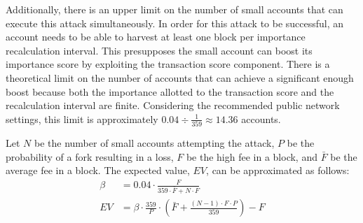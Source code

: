 Additionally, there is an upper limit on the number of small accounts that can execute this attack simultaneously.
In order for this attack to be successful, an account needs to be able to harvest at least one block per importance recalculation interval.
This presupposes the small account can boost its importance score by exploiting the transaction score component.
There is a theoretical limit on the number of accounts that can achieve a significant enough boost because both the importance allotted to the transaction score and the recalculation interval are finite.
Considering the recommended public network settings, this limit is approximately $0.04 \div \frac{1}{359} \approx 14.36$ accounts.

Let $N$ be the number of small accounts attempting the attack, $P$ be the probability of a fork resulting in a loss, $F$ be the high fee in a block, and $\bar{F}$ be the average fee in a block.
The expected value, $EV$, can be approximated as follows:
\begin{align*}
	\tag{importance boost}\beta &= 0.04 \cdot \frac{F}{359 \cdot \bar{F} + N \cdot F} \\
	\tag{expected value} EV &= \beta \cdot \frac{359}{P} \cdot \left( \bar{F} + \frac{\left( N - 1\right ) \cdot F \cdot P}{359} \right) - F
\end{align*}

\begin{figure}[H]
\end{figure}
